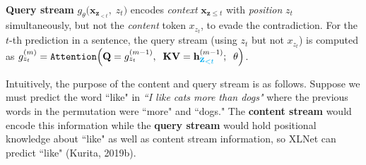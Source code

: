 \textbf{Query stream} $g_\theta \Big( \textbf{x}_{\textbf{z}_{< t}}, \; z_t \Big)$ encodes \emph{context} $\textbf{x}_{\textbf{z} \leq t}$ with \emph{position} $z_t$ simultaneously, but not the \emph{content} token $x_{z_t}$, to evade the contradiction. For the $t$-th prediction in a sentence, the query stream (using $z_t$ but not $x_{z_t}$) is computed as $g_{z_t}^{(m)} = \texttt{Attention} \Big( \textbf{Q} = g_{z_t}^{(m-1)}, \;\; \textbf{KV} = \textbf{h}_{ {\color{cyan} \mathlarger{\mathlarger{\mathbf{z}_{< t}}}  } }^{(m-1)}; \;\; \theta  \Big)$.


%     
%     


Intuitively, the purpose of the content and query stream is as follows. Suppose we must predict the word ``like" in \textit{``I like cats more than dogs"} where the previous words in the permutation were ``more" and ``dogs." The \textbf{content stream} would encode this information while the \textbf{query stream} would hold positional knowledge about ``like" as well as content stream information, so XLNet can predict ``like" (Kurita, 2019b). 




